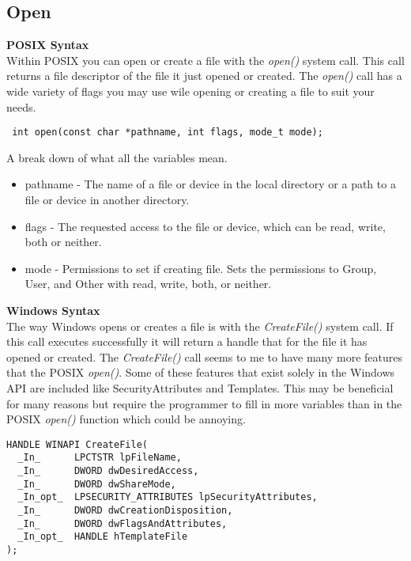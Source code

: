\documentclass[letterpaper,10pt,notitlepage,fleqn]{article}
\begin{document}
\subsection{Open}
\textbf{POSIX Syntax} \\
Within POSIX you can open or create a file with the \textit{open()} system call. This call returns a file descriptor of the file it just opened or created. The \textit{open()} call has a wide variety of flags you may use wile opening or creating a file to suit your needs. 

\begin{verbatim}
 int open(const char *pathname, int flags, mode_t mode);
\end{verbatim}

A break down of what all the variables mean.

\begin{itemize}
\item pathname - The name of a file or device in the local directory or a path to a file or device in another directory.
\item flags - The requested access to the file or device, which can be read, write, both or neither.
\item mode - Permissions to set if creating file. Sets the permissions to Group, User, and Other with read, write, both, or neither.
\end{itemize}

\textbf{Windows Syntax} \\
The way Windows opens or creates a file is with the \textit{CreateFile()} system call. If this call executes successfully it will return a handle that for the file it has opened or created. The \textit{CreateFile()} call seems to me to have many more features that the POSIX \textit{open()}. Some of these features that exist solely in the Windows API are included like SecurityAttributes and Templates. This may be beneficial for many reasons but require the programmer to fill in more variables than in the POSIX \textit{open()} function which could be annoying.

\begin{verbatim}
HANDLE WINAPI CreateFile(
  _In_      LPCTSTR lpFileName,
  _In_      DWORD dwDesiredAccess,
  _In_      DWORD dwShareMode,	
  _In_opt_  LPSECURITY_ATTRIBUTES lpSecurityAttributes,	
  _In_      DWORD dwCreationDisposition,
  _In_      DWORD dwFlagsAndAttributes,
  _In_opt_  HANDLE hTemplateFile
);
\end{verbatim}
\end{document}
